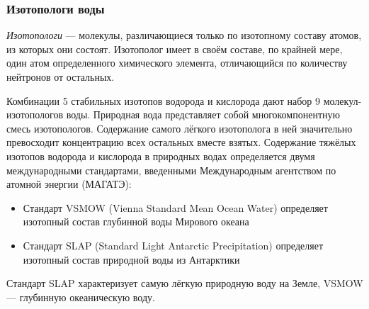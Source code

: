 \begin{frame}
\frametitle{Изотопологи воды}

\emph{Изотопологи} --- молекулы, различающиеся только по изотопному составу атомов, из которых они состоят. Изотополог имеет в своём составе, по крайней мере, один атом определенного химического элемента, отличающийся по количеству нейтронов от остальных.

Комбинации 5 стабильных изотопов водорода и кислорода дают набор 9 молекул-изотопологов воды. 
Природная вода представляет собой многокомпонентную смесь изотопологов. Содержание самого лёгкого изотополога в ней значительно превосходит концентрацию всех остальных вместе взятых. Содержание тяжёлых изотопов водорода и кислорода в природных водах определяется двумя международными стандартами, введенными Международным агентством по атомной энергии (МАГАТЭ):
\begin{itemize}
	\item Стандарт VSMOW (Vienna Standard Mean Ocean Water) определяет изотопный состав глубинной воды Мирового океана \cite{VSMOW} 
	\item Стандарт SLAP (Standard Light Antarctic Precipitation) определяет изотопный состав природной воды из Антарктики \cite{SLAP} 
\end{itemize}

Стандарт SLAP характеризует самую лёгкую природную воду на Земле, VSMOW --- глубинную океаническую воду. 

\end{frame}


